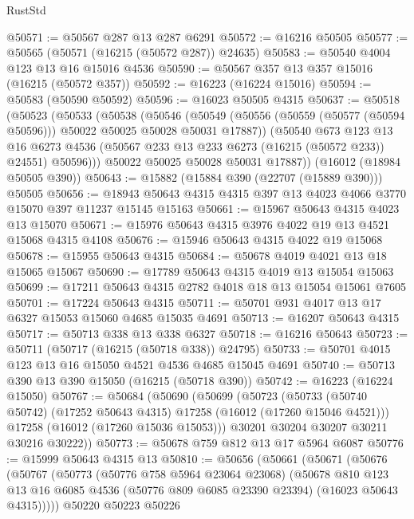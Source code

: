 \begin{lexlean}{RustStd}
\begin{coremodule}
@50571 := @50567 @287 @13 @287 @6291
@50572 := @16216 @50505
@50577 := @50565 (@50571 (@16215 (@50572 @287)) @24635)
@50583 := @50540 @4004 @123 @13 @16 @15016 @4536
@50590 := @50567 @357 @13 @357 @15016 (@16215 (@50572 @357))
@50592 := @16223 (@16224 @15016)
@50594 := @50583 (@50590 @50592)
@50596 := @16023 @50505 @4315
@50637 := @50518
    (@50523
      (@50533
        (@50538
          (@50546
            (@50549 (@50556 (@50559 (@50577 (@50594 @50596))) @50022 @50025 @50028 @50031 @17887))
            (@50540
              @673
              @123
              @13
              @16
              @6273
              @4536
              (@50567 @233 @13 @233 @6273 (@16215 (@50572 @233)) @24551)
              @50596)))
        @50022
        @50025
        @50028
        @50031
        @17887))
    (@16012 (@18984 @50505 @390))
@50643 := @15882 (@15884 @390 (@22707 (@15889 @390))) @50505
@50656 := @18943 @50643 @4315 @4315 @397 @13 @4023 @4066 @3770 @15070 @397 @11237 @15145 @15163
@50661 := @15967 @50643 @4315 @4023 @13 @15070
@50671 := @15976 @50643 @4315 @3976 @4022 @19 @13 @4521 @15068 @4315 @4108
@50676 := @15946 @50643 @4315 @4022 @19 @15068
@50678 := @15955 @50643 @4315
@50684 := @50678 @4019 @4021 @13 @18 @15065 @15067
@50690 := @17789 @50643 @4315 @4019 @13 @15054 @15063
@50699 := @17211 @50643 @4315 @2782 @4018 @18 @13 @15054 @15061 @7605
@50701 := @17224 @50643 @4315
@50711 := @50701 @931 @4017 @13 @17 @6327 @15053 @15060 @4685 @15035 @4691
@50713 := @16207 @50643 @4315
@50717 := @50713 @338 @13 @338 @6327
@50718 := @16216 @50643
@50723 := @50711 (@50717 (@16215 (@50718 @338)) @24795)
@50733 := @50701 @4015 @123 @13 @16 @15050 @4521 @4536 @4685 @15045 @4691
@50740 := @50713 @390 @13 @390 @15050 (@16215 (@50718 @390))
@50742 := @16223 (@16224 @15050)
@50767 := @50684
    (@50690
      (@50699
        (@50723
          (@50733 (@50740 @50742) (@17252 @50643 @4315) @17258 (@16012 (@17260 @15046 @4521)))
          @17258
          (@16012 (@17260 @15036 @15053)))
        @30201
        @30204
        @30207
        @30211
        @30216
        @30222))
@50773 := @50678 @759 @812 @13 @17 @5964 @6087
@50776 := @15999 @50643 @4315 @13
@50810 := @50656
    (@50661
      (@50671
        (@50676
          (@50767
            (@50773
              (@50776 @758 @5964 @23064 @23068)
              (@50678
                @810
                @123
                @13
                @16
                @6085
                @4536
                (@50776 @809 @6085 @23390 @23394)
                (@16023 @50643 @4315)))))
        @50220
        @50223
        @50226

\end{coremodule}
\end{lexlean}
